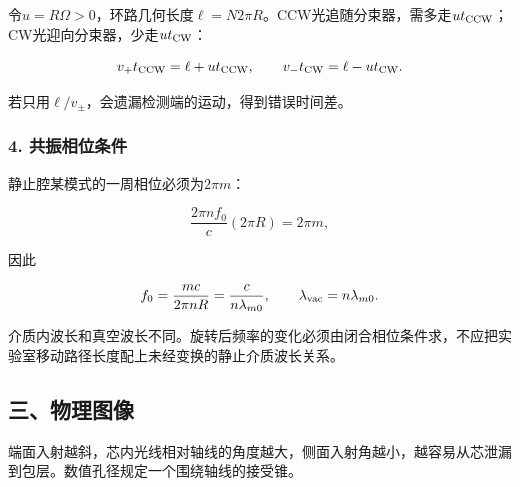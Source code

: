 \documentclass[12pt,a4paper,fontset=fandol]{ctexart}
\begin{document}
令\(u=R\Omega>0\)，环路几何长度\(\ell=N2\pi R\)。CCW光追随分束器，需多走\(ut_{\rm CCW}\)；CW光迎向分束器，少走\(ut_{\rm CW}\)：

\[
v_+t_{\rm CCW}=\ell+ut_{\rm CCW},
\qquad
v_-t_{\rm CW}=\ell-ut_{\rm CW}.
\]

若只用\(\ell/v_\pm\)，会遗漏检测端的运动，得到错误时间差。

\subsubsection{4.
共振相位条件}\label{ux5171ux632fux76f8ux4f4dux6761ux4ef6}

静止腔某模式的一周相位必须为\(2\pi m\)：

\[
\frac{2\pi n f_0}{c}(2\pi R)=2\pi m,
\]

因此

\[
f_0=\frac{mc}{2\pi nR}
=\frac{c}{n\lambda_{m0}},
\qquad
\lambda_{\rm vac}=n\lambda_{m0}.
\]

介质内波长和真空波长不同。旋转后频率的变化必须由闭合相位条件求，不应把实验室移动路径长度配上未经变换的静止介质波长关系。

\subsection{三、物理图像}\label{ux4e09ux7269ux7406ux56feux50cf-5}

端面入射越斜，芯内光线相对轴线的角度越大，侧面入射角越小，越容易从芯泄漏到包层。数值孔径规定一个围绕轴线的接受锥。

\begin{center}
\begin{minipage}{\linewidth}
\centering\begingroup{}
\ifdim\wd\diagrambox>.88\linewidth
\sbox{\diagrambox}{\resizebox{.88\linewidth}{!}{\usebox{\diagrambox}}}\fi
\ifdim\ht\diagrambox>.38\textheight
\resizebox{!}{.38\textheight}{\usebox{\diagrambox}}
\else\usebox{\diagrambox}\fi
\par{}\endgroup\end{minipage}\end{center}
\end{document}
